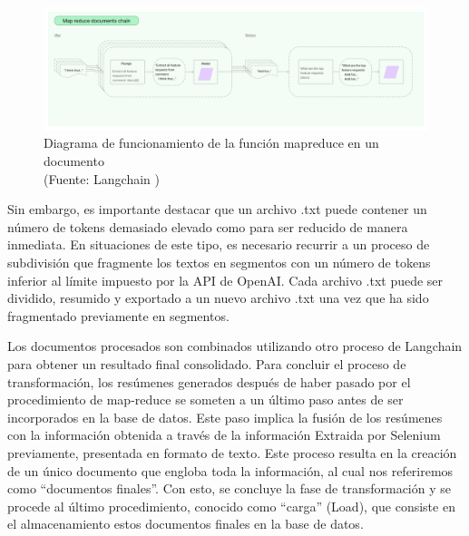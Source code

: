 \begin{figure}[ht!]
    \centering
    \includegraphics[width=.9\textwidth]{figures/huemul_mapreduce.jpg}
    \caption[Diagrama de funcionamiento de la función mapreduce en un documento]{Diagrama de funcionamiento de la función mapreduce en un documento\\
    {\scriptsize (Fuente: Langchain \cite{framework1})}}
    \label{fig:chatbot1}
\end{figure}

\par Sin embargo, es importante destacar que un archivo .txt puede contener un número de tokens demasiado elevado como para ser 
reducido de manera inmediata. En situaciones de este tipo, es necesario recurrir a un proceso de subdivisión que fragmente los 
textos en segmentos con un número de tokens inferior al límite impuesto por la API de OpenAI.
Cada archivo .txt puede ser dividido, 
resumido y exportado a un nuevo archivo .txt una vez que ha sido fragmentado previamente en segmentos.

\par Los documentos procesados son combinados utilizando otro proceso de Langchain para obtener un resultado final consolidado. 
Para concluir el proceso de transformación, los resúmenes generados después de haber pasado por el procedimiento de map-reduce 
se someten a un último paso antes de ser incorporados en la base de datos. Este paso implica la fusión de los resúmenes con la 
información obtenida a través de la información Extraida por Selenium previamente, presentada en formato de texto. Este proceso 
resulta en la creación de un único documento que engloba toda la información, al cual nos referiremos como ``documentos finales''. 
Con esto, se concluye la fase de transformación y se procede al último procedimiento, conocido como ``carga'' (Load), que consiste 
en el almacenamiento estos documentos finales en la base de datos.


